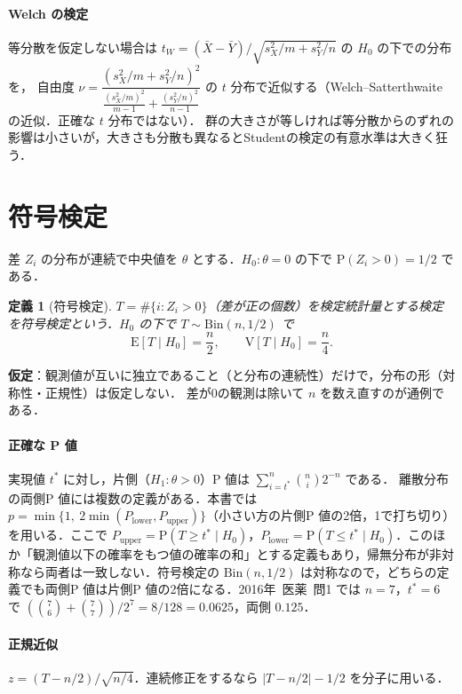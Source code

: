 \documentclass[a4paper,11pt,openany]{ltjsbook}
\newtheorem{teigi}{定義}[chapter]
\newcommand{\tagbox}[2]{\tcbox[on line,boxsep=0.5pt,left=2pt,right=2pt,top=0.5pt,bottom=0.5pt,
  colframe=#1,colback=#1!10,boxrule=0.4pt,arc=1pt]{\scriptsize\bfseries\textcolor{#1}{#2}}}
\newcommand{\Hissu}{\tagbox{bkred}{必須}}
\newcommand{\Youchui}{\tagbox{bkpurple}{要注意}}
\newcommand{\kakomon}[2]{\mbox{#1年 医薬 問#2}}
\newcommand{\E}{\mathrm{E}}
\newcommand{\V}{\mathrm{V}}
\newcommand{\Prob}{\mathrm{P}}
\newcommand{\Bin}{\mathrm{Bin}}
\begin{document}
\paragraph{Welch の検定}
等分散を仮定しない場合は $t_W=(\bar X-\bar Y)/\sqrt{s_X^2/m+s_Y^2/n}$ の $H_0$ の下での分布を，
自由度 $\nu=\dfrac{(s_X^2/m+s_Y^2/n)^2}{\frac{(s_X^2/m)^2}{m-1}+\frac{(s_Y^2/n)^2}{n-1}}$ の $t$ 分布で近似する（Welch--Satterthwaite の近似．正確な $t$ 分布ではない）．
群の大きさが等しければ等分散からのずれの影響は小さいが，大きさも分散も異なるとStudentの検定の有意水準は大きく狂う．

\section{符号検定}\label{sec:03-sign}
\Hissu 差 $Z_i$ の分布が連続で中央値を $\theta$ とする．$H_0:\theta=0$ の下で $\Prob(Z_i>0)=1/2$ である．
\begin{teigi}[符号検定]\label{def:03-sign}
$T=\#\{i:Z_i>0\}$（差が正の個数）を検定統計量とする検定を符号検定という．$H_0$ の下で $T\sim\Bin(n,1/2)$ で
\begin{equation}
\E[T\mid H_0]=\frac n2,\qquad \V[T\mid H_0]=\frac n4.\label{eq:03-signmoments}
\end{equation}
\end{teigi}
\textbf{仮定}：観測値が互いに独立であること（と分布の連続性）だけで，分布の形（対称性・正規性）は仮定しない．
差が0の観測は除いて $n$ を数え直すのが通例である．

\paragraph{正確な P 値}
実現値 $t^*$ に対し，片側（$H_1:\theta>0$）P 値は $\sum_{i=t^*}^{n}\binom ni2^{-n}$ である．
\Youchui 離散分布の両側P 値には複数の定義がある．本書では $p=\min\{1,\ 2\min(P_{\mathrm{lower}},P_{\mathrm{upper}})\}$（小さい方の片側P 値の2倍，1で打ち切り）を用いる．ここで $P_{\mathrm{upper}}=\Prob(T\ge t^*\mid H_0)$，$P_{\mathrm{lower}}=\Prob(T\le t^*\mid H_0)$．このほか「観測値以下の確率をもつ値の確率の和」とする定義もあり，帰無分布が非対称なら両者は一致しない．符号検定の $\Bin(n,1/2)$ は対称なので，どちらの定義でも両側P 値は片側P 値の2倍になる．\kakomon{2016}{1} では $n=7$，$t^*=6$ で
$(\binom76+\binom77)/2^7=8/128=0.0625$，両側 $0.125$．
\paragraph{正規近似}
$z=(T-n/2)/\sqrt{n/4}$．連続修正をするなら $|T-n/2|-1/2$ を分子に用いる．
\end{document}

